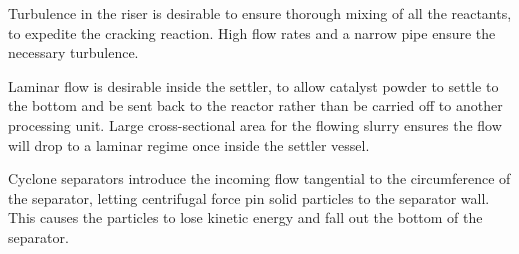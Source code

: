 Turbulence in the riser is desirable to ensure thorough mixing of all the reactants, to expedite the cracking reaction.  High flow rates and a narrow pipe ensure the necessary turbulence.
 
\vskip 10pt

Laminar flow is desirable inside the settler, to allow catalyst powder to settle to the bottom and be sent back to the reactor rather than be carried off to another processing unit.  Large cross-sectional area for the flowing slurry ensures the flow will drop to a laminar regime once inside the settler vessel.

\vskip 10pt

Cyclone separators introduce the incoming flow tangential to the circumference of the separator, letting centrifugal force pin solid particles to the separator wall.  This causes the particles to lose kinetic energy and fall out the bottom of the separator.












